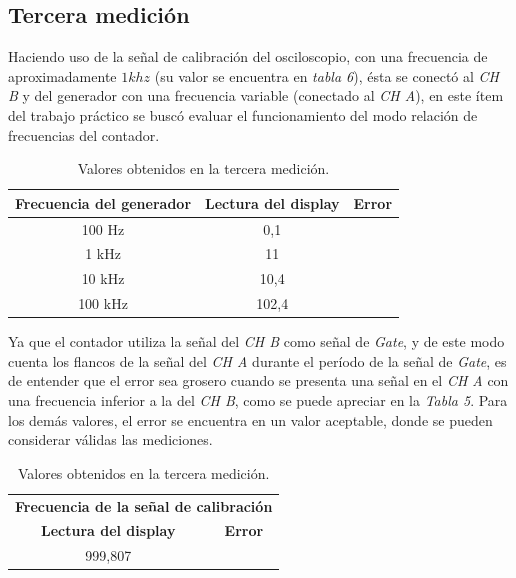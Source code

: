 \documentclass{article}
\begin{document}
\subsection{Tercera medición}
\medskip

Haciendo uso de la señal de calibración del osciloscopio, con una frecuencia de aproximadamente $1 khz$ (su valor se encuentra en \textit{tabla 6}), ésta se conectó al \textit{CH B} y del generador con una frecuencia variable (conectado al \textit{CH A}), en este ítem del trabajo práctico se buscó evaluar el funcionamiento del modo relación de frecuencias del contador.

\begin{table}[!hbt]
	\begin{center}
		\begin{tabular}{|c|c|c|} \hline
			\textbf{Frecuencia del generador} & \textbf{Lectura del display} & \textbf{Error} \\\hline
			100 Hz & 0,1 &  \\\hline
			1 kHz & 11 &  \\\hline
			10 kHz & 10,4 &  \\\hline
			100 kHz & 102,4 &  \\\hline
		\end{tabular}

	\caption{Valores obtenidos en la tercera medición.}
	\end{center}
\end{table}
\medskip

Ya que el contador utiliza la señal del \textit{CH B} como señal de \textit{Gate}, y de este modo cuenta los flancos de la señal del \textit{CH A} durante el período  de la señal de \textit{Gate}, es de entender que el error sea grosero cuando se presenta una señal en el \textit{CH A} con una frecuencia inferior a la del \textit{CH B}, como se puede apreciar en la \textit{Tabla 5}. Para los demás valores, el error se encuentra en un valor aceptable, donde se pueden considerar válidas las mediciones.

\begin{table}[!hbt]
	\begin{center}
		\begin{tabular}{|c|c|} \hline
			\multicolumn{2}{|c|}{\textbf{Frecuencia de la señal de calibración}} \\\cline{1-2}
			\textbf{Lectura del display} & \textbf{Error} \\\hline
			999,807 & \\\hline
		\end{tabular}

	\caption{Valores obtenidos en la tercera medición.}
	\end{center}
\end{table}
\medskip
\end{document}
